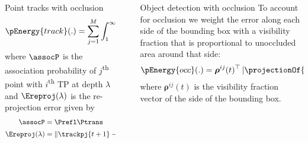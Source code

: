 \documentclass[handout,final]{beamer}
\newlength{\sepwid}
\newlength{\onecolwid}
\begin{document}
\begin{frame}[t]
\begin{columns}[t]
\begin{column}{\onecolwid}
\begin{block}{Point tracks with occlusion}
        \begin{align}
          \pEnergy{track}(.) =
          \sum_{j = 1}^{M}
          \int_1^\infty \assocP\Ereproj(\lambda) d\lambda
        \end{align}
        where $\assocP$ is the association probability of
        $j$\textsuperscript{th} point with $i$\textsuperscript{th} TP at depth $\lambda$
        and $\Ereproj(\lambda)$ is the re-projection error given by
        \begin{align}
          \assocP &= \Prefl\Ptrans\\
          \Ereproj(\lambda) &= \left\|\trackpj{t+1} - \projectionOft{\invProjectionOf{\trackpj{t}, \lambda}}\right\|^2 .
          \label{eq:reprojerror}
        \end{align}

      \end{block}

    \end{column}

  \begin{column}{\sepwid}\end{column}			%

    \begin{column}{\onecolwid}

      \begin{block}{Object detection with occlusion}
        To account for occlusion we weight the error along each side of the
        bounding box with a visibility fraction that is proportional to
        unoccluded area around that side:
        \begin{align}
          \pEnergy{occ}(.) =
          \bm{\rho}^{ij}(t)^\top\left|\projectionOf{\dimsn{i}} - \bb{i}\right|
          \enspace,
        \end{align}
        where $\bm{\rho}^{ij}(t)$ is the visibility fraction vector of the side
        of the bounding box.
        
      \end{block}



\end{column}
\end{columns}
\end{frame}
\end{document}
